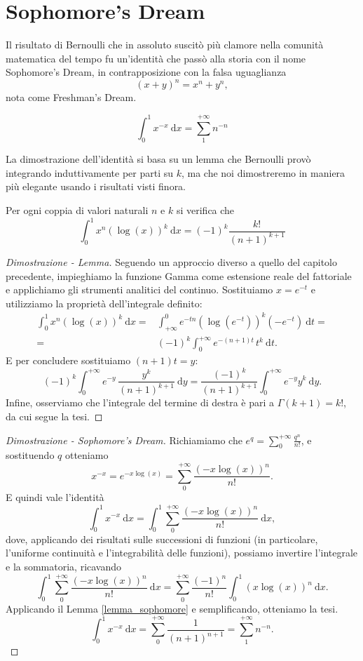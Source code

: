 \chapter{Sophomore's Dream}
Il risultato di Bernoulli che in assoluto suscitò più clamore nella comunità matematica del tempo fu un'identità che passò alla storia con il nome Sophomore's Dream, in contrapposizione con la falsa uguaglianza
\[
	(x+y)^n=x^n+y^n,
\]
nota come Freshman's Dream.
\begin{Res}
	\begin{equation}
		\int^1_0x^{-x}\:\mathrm{d}x=\sum^{+\infty}_1n^{-n}
	\end{equation}
\end{Res}
La dimostrazione dell'identità si basa su un lemma che Bernoulli provò integrando induttivamente per parti su $k$, ma che noi dimostreremo in maniera più elegante usando i risultati visti finora.
\begin{Lem}
	\label{lemma_sophomore}
	Per ogni coppia di valori naturali $n$ e $k$ si verifica che
	\[
		\int^1_0x^n(\log(x))^k \:\mathrm{d}x=(-1)^k\frac{k!}{(n+1)^{k+1}}
	\]
\end{Lem}
\begin{proof}[Dimostrazione - Lemma]
	Seguendo un approccio diverso a quello del capitolo precedente, impieghiamo la funzione Gamma come estensione reale del fattoriale e applichiamo gli strumenti analitici del continuo. Sostituiamo $x=e^{-t}$ e utilizziamo la proprietà dell'integrale definito:
	\begin{equation*}
		\begin{split}
			\int^1_0x^n(\log(x))^k \:\mathrm{d}x=&\int_{+\infty}^0e^{-tn}\left(\log\left(e^{-t}\right)\right)^k \left(-e^{-t}\right) \:\mathrm{d}t=\\
			=&(-1)^k\int^{+\infty}_0e^{-(n+1)t}\, t^k \:\mathrm{d}t.
		\end{split}
	\end{equation*}
	E per concludere sostituiamo $(n+1)t=y$:
	\[
		(-1)^k\int^{+\infty}_0e^{-y}\,\frac{y^k}{(n+1)^{k+1}} \:\mathrm{d}y=\frac{(-1)^k}{(n+1)^{k+1}}\int^{+\infty}_0e^{-y}y^k\:\mathrm{d}y.
	\]
	Infine, osserviamo che l'integrale del termine di destra è pari a $\Gamma(k+1)=k!$, da cui segue la tesi.
\end{proof}
\begin{proof}[Dimostrazione - Sophomore's Dream]
	Richiamiamo che $e^q=\sum^{+\infty}_0\frac{q^n}{n!}$, e sostituendo $q$ otteniamo
	\[
		x^{-x}=e^{-x\log(x)}=\sum^{+\infty}_0\frac{(-x\log(x))^n}{n!}.
	\]
	E quindi vale l'identità
	\[
		\int^1_0x^{-x}\:\mathrm{d}x=\int^1_0\sum^{+\infty}_0\frac{(-x\log(x))^n}{n!}\:\mathrm{d}x,
	\]
	dove, applicando dei risultati sulle successioni di funzioni (in particolare, l'uniforme continuità e l'integrabilità delle funzioni), possiamo invertire l'integrale e la sommatoria, ricavando
	\[
		\int^1_0\sum^{+\infty}_0\frac{(-x\log(x))^n}{n!}\:\mathrm{d}x=\sum^{+\infty}_0\frac{(-1)^n}{n!}\int^1_0(x\log(x))^n \:\mathrm{d}x.
	\]
	Applicando il Lemma \ref{lemma_sophomore} e semplificando, otteniamo la tesi.
	\[
		\int^1_0x^{-x}\:\mathrm{d}x=\sum^{+\infty}_0\frac{1}{(n+1)^{n+1}}=\sum^{+\infty}_1n^{-n}.
	\]
\end{proof}

